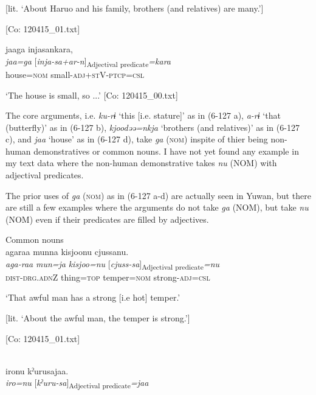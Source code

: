 [lit. ‘About Haruo and his family, brothers (and relatives) are many.’]

      [Co: 120415\_01.txt]
\z

 \ex {\TM}  jaaga  injasankara,\\
\gll \textit{jaa=ga}  [\textit{inja-sa+ar-n}]\textsubscript{Adjectival predicate}\textit{=kara}\\

      house=\textsc{nom}  small-\textsc{adj}+\textsc{st}V-\textsc{ptcp}=\textsc{csl}

\glt ‘The house is small, so ...’ [Co: 120415\_00.txt]
\z

The core arguments, i.e. \textit{ku-rɨ} ‘this [i.e. stature]’ as in (6-127 a), \textit{a-rɨ} ‘that (butterfly)’ as in (6-127 b), \textit{kjoodəə=nkja} ‘brothers (and relatives)’ as in (6-127 c), and \textit{jaa} ‘house’ as in (6-127 d), take \textit{ga} (\textsc{nom}) inspite of thier being non-human demonstratives or common nouns. I have not yet found any example in my text data where the non-human demonstrative takes \textit{nu} (NOM) with adjectival predicates.

The prior uses of \textit{ga} (\textsc{nom}) as in (6-127 a-d) are actually seen in Yuwan, but there are still a few examples where the arguments do not take \textit{ga} (NOM), but take \textit{nu} (NOM) even if their predicates are filled by adjectives.

\ea\label{ex:6-128}
 Common nouns\\

 \ea {\TM}  agaraa  munna  kisjoonu  cjussanu.\\
\gll \textit{aga-raa}  \textit{mun=ja}  \textit{kisjoo=nu}  [\textit{cjuss-sa}]\textsubscript{Adjectival predicate}\textit{=nu}\\

      \textsc{dist}-\textsc{drg}.\textsc{adn}Z  thing=\textsc{top}  temper=\textsc{nom}  strong-\textsc{adj}=\textsc{csl}

\glt ‘That awful man has a strong [i.e hot] temper.’

[lit. ‘About the awful man, the temper is strong.’]

      [Co: 120415\_01.txt]
\z

 \ex{}\\
{\TM}
\gll  {\textbar}iro{\textbar}nu  kˀurusajaa.\\

      \textit{iro=nu}  [\textit{kˀuru-sa}]\textsubscript{Adjectival predicate}\textit{=jaa}

